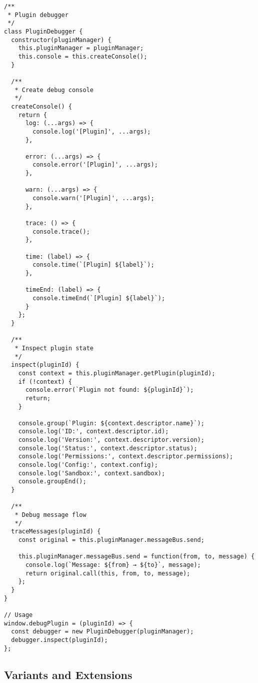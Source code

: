 \documentclass[11pt]{article}
\begin{document}
\begin{verbatim}
/**
 * Plugin debugger
 */
class PluginDebugger {
  constructor(pluginManager) {
    this.pluginManager = pluginManager;
    this.console = this.createConsole();
  }
  
  /**
   * Create debug console
   */
  createConsole() {
    return {
      log: (...args) => {
        console.log('[Plugin]', ...args);
      },
      
      error: (...args) => {
        console.error('[Plugin]', ...args);
      },
      
      warn: (...args) => {
        console.warn('[Plugin]', ...args);
      },
      
      trace: () => {
        console.trace();
      },
      
      time: (label) => {
        console.time(`[Plugin] ${label}`);
      },
      
      timeEnd: (label) => {
        console.timeEnd(`[Plugin] ${label}`);
      }
    };
  }
  
  /**
   * Inspect plugin state
   */
  inspect(pluginId) {
    const context = this.pluginManager.getPlugin(pluginId);
    if (!context) {
      console.error(`Plugin not found: ${pluginId}`);
      return;
    }
    
    console.group(`Plugin: ${context.descriptor.name}`);
    console.log('ID:', context.descriptor.id);
    console.log('Version:', context.descriptor.version);
    console.log('Status:', context.descriptor.status);
    console.log('Permissions:', context.descriptor.permissions);
    console.log('Config:', context.config);
    console.log('Sandbox:', context.sandbox);
    console.groupEnd();
  }
  
  /**
   * Debug message flow
   */
  traceMessages(pluginId) {
    const original = this.pluginManager.messageBus.send;
    
    this.pluginManager.messageBus.send = function(from, to, message) {
      console.log(`Message: ${from} → ${to}`, message);
      return original.call(this, from, to, message);
    };
  }
}

// Usage
window.debugPlugin = (pluginId) => {
  const debugger = new PluginDebugger(pluginManager);
  debugger.inspect(pluginId);
};
\end{verbatim}
\subsection{Variants and Extensions}
\label{sec:orgacb04eb}
\end{document}

